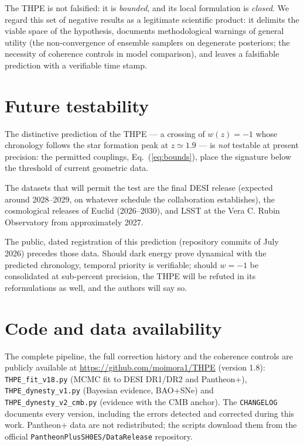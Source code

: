 \documentclass[aps,prd,twocolumn,superscriptaddress,nofootinbib,floatfix]{revtex4-2}
\begin{document}
The THPE is not falsified: it is \emph{bounded}, and its local
formulation is \emph{closed}. We regard this set of negative results as
a legitimate scientific product: it delimits the viable space of the
hypothesis, documents methodological warnings of general utility (the
non-convergence of ensemble samplers on degenerate posteriors; the
necessity of coherence controls in model comparison), and leaves a
falsifiable prediction with a verifiable time stamp.

\section{Future testability}
\label{sec:future}

The distinctive prediction of the THPE --- a crossing of $w(z)=-1$ whose
chronology follows the star formation peak at $z\simeq1.9$ --- is
\emph{not} testable at present precision: the permitted couplings,
Eq.~(\ref{eq:bounds}), place the signature below the threshold of
current geometric data.

The datasets that will permit the test are the final DESI release
(expected around 2028--2029, on whatever schedule the collaboration
establishes), the cosmological releases of Euclid \cite{Euclid2011}
(2026--2030), and LSST at the Vera C. Rubin Observatory
\cite{LSST2019} from approximately 2027.

The public, dated registration of this prediction (repository commits of
July 2026) precedes those data. Should dark energy prove dynamical with
the predicted chronology, temporal priority is verifiable; should
$w=-1$ be consolidated at sub-percent precision, the THPE will be
refuted in its reformulations as well, and the authors will say so.

\section*{Code and data availability}

The complete pipeline, the full correction history and the coherence
controls are publicly available at
\url{https://github.com/moimora1/THPE} (version 1.8):
\texttt{THPE\_fit\_v18.py} (MCMC fit to DESI DR1/DR2 and Pantheon+),
\texttt{THPE\_dynesty\_v1.py} (Bayesian evidence, BAO+SNe) and
\texttt{THPE\_dynesty\_v2\_cmb.py} (evidence with the CMB anchor). The
\texttt{CHANGELOG} documents every version, including the errors
detected and corrected during this work. Pantheon+ data are not
redistributed; the scripts download them from the official
\texttt{PantheonPlusSH0ES/DataRelease} repository.
\end{document}
